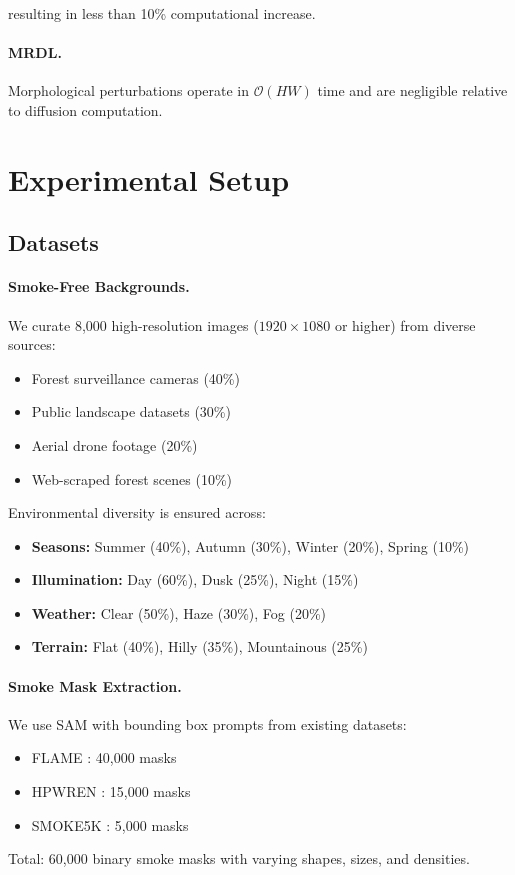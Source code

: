 \documentclass[journal]{IEEEtran}
\begin{document}
resulting in less than 10\% computational increase.

\paragraph{MRDL.}

Morphological perturbations operate in $\mathcal{O}(HW)$ time and are negligible relative to diffusion computation.



\section{Experimental Setup}
\label{sec:experiments}

\subsection{Datasets}

\paragraph{Smoke-Free Backgrounds.}
We curate 8,000 high-resolution images ($1920\times1080$ or higher) from diverse sources:
\begin{itemize}
    \item Forest surveillance cameras (40\%)
    \item Public landscape datasets (30\%)
    \item Aerial drone footage (20\%)
    \item Web-scraped forest scenes (10\%)
\end{itemize}

Environmental diversity is ensured across:
\begin{itemize}
    \item \textbf{Seasons:} Summer (40\%), Autumn (30\%), Winter (20\%), Spring (10\%)
    \item \textbf{Illumination:} Day (60\%), Dusk (25\%), Night (15\%)
    \item \textbf{Weather:} Clear (50\%), Haze (30\%), Fog (20\%)
    \item \textbf{Terrain:} Flat (40\%), Hilly (35\%), Mountainous (25\%)
\end{itemize}

\paragraph{Smoke Mask Extraction.}
We use SAM \cite{kirillov2023segment} with bounding box prompts from existing datasets:
\begin{itemize}
    \item FLAME \cite{SHAMSOSHOARA2021108001}: 40,000 masks
    \item HPWREN \cite{los1998high}: 15,000 masks
    \item SMOKE5K \cite{yan2023transmissionguidedbayesiangenerativemodel}: 5,000 masks
\end{itemize}
Total: 60,000 binary smoke masks with varying shapes, sizes, and densities.
\end{document}
